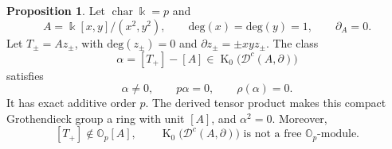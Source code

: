 \documentclass[11pt]{article}
\theoremstyle{definition}
\newtheorem{prop}[thm]{Proposition}
\numberwithin{equation}{section}
\newcommand{\kk}{\Bbbk}
\newcommand{\K}{\operatorname{K}_0}
\begin{document}
\begin{prop}\label{prop:K0-p-torsion}
Let $\operatorname{char}\kk=p$ and
\begin{equation}\label{eq:K0-torsion-algebra}
 A=\kk[x,y]/(x^2,y^2),\qquad \mathrm{deg}(x)=\mathrm{deg}(y)=1,\qquad\partial_A=0.
\end{equation}
Let $T_\pm=Az_\pm$, with $\mathrm{deg}(z_\pm)=0$ and
$\partial z_\pm=\pm xy z_\pm$.  The class
\begin{equation}\label{eq:K0-torsion-class}
 \alpha=[T_+]-[A]\in\K\bigl(\mathcal D^c(A,\partial)\bigr)
\end{equation}
satisfies
\begin{equation}\label{eq:K0-torsion-properties}
 \alpha\ne0,\qquad p\alpha=0,\qquad\rho(\alpha)=0.
\end{equation}
It has exact additive order $p$.  The derived tensor product makes
this compact Grothendieck group a ring with unit $[A]$, and
$\alpha^2=0$.  Moreover,
\[
 [T_+]\notin\mathbb O_p[A],
 \qquad
 \K\bigl(\mathcal D^c(A,\partial)\bigr)
 \text{ is not a free }\mathbb O_p\text{-module}.
\]
\end{prop}
\end{document}

